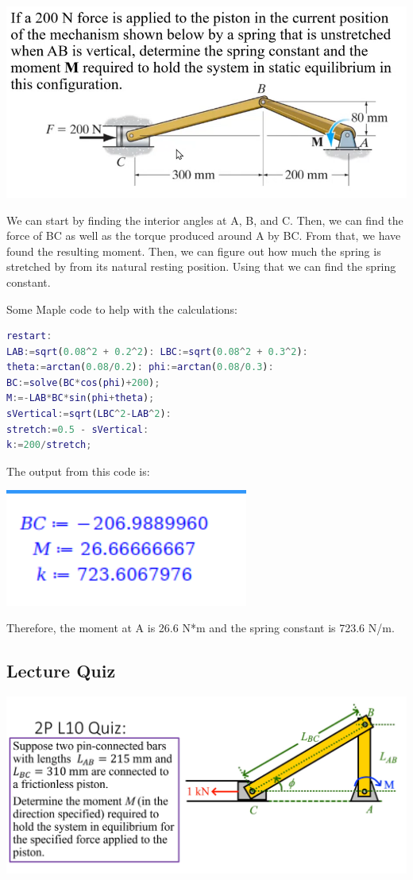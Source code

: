 \documentclass{article}[14pt, letterpaper, Times New Roman]
\begin{document}
\includegraphics[width=15cm]{l10-lq.png}

We can start by finding the interior angles at A, B, and C.
Then, we can find the force of BC as well as the torque produced around A by BC.
From that, we have found the resulting moment.
Then, we can figure out how much the spring is stretched by from its natural resting position.
Using that we can find the spring constant.

Some Maple code to help with the calculations:

\begin{lstlisting}[language=matlab]
restart:
LAB:=sqrt(0.08^2 + 0.2^2): LBC:=sqrt(0.08^2 + 0.3^2):
theta:=arctan(0.08/0.2): phi:=arctan(0.08/0.3):
BC:=solve(BC*cos(phi)+200);
M:=-LAB*BC*sin(phi+theta);
sVertical:=sqrt(LBC^2-LAB^2):
stretch:=0.5 - sVertical:
k:=200/stretch;
\end{lstlisting}

The output from this code is:

\includegraphics[width=8cm]{l10-lq-o.png}

Therefore, the moment at A is 26.6 N*m and the spring constant is 723.6 N/m.

\subsection{Lecture Quiz}

\includegraphics[width=15cm]{l10-quiz.png}
\end{document}
